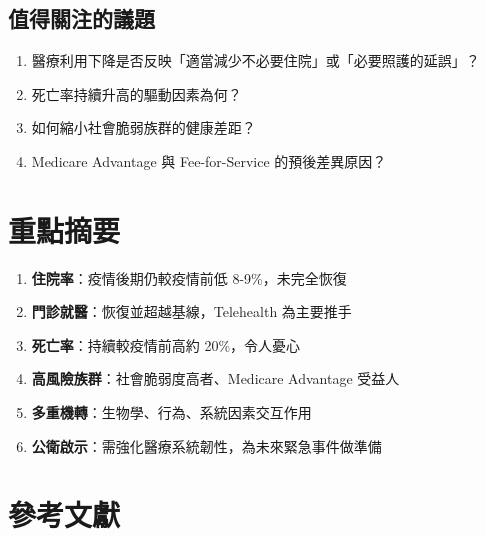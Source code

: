 \documentclass[12pt,a4paper]{article}
\begin{document}
\subsection{值得關注的議題}
\begin{enumerate}
    \item 醫療利用下降是否反映「適當減少不必要住院」或「必要照護的延誤」？
    \item 死亡率持續升高的驅動因素為何？
    \item 如何縮小社會脆弱族群的健康差距？
    \item Medicare Advantage 與 Fee-for-Service 的預後差異原因？
\end{enumerate}

\section{重點摘要}

\begin{enumerate}
    \item \textbf{住院率}：疫情後期仍較疫情前低 8-9\%，未完全恢復
    \item \textbf{門診就醫}：恢復並超越基線，Telehealth 為主要推手
    \item \textbf{死亡率}：持續較疫情前高約 20\%，令人憂心
    \item \textbf{高風險族群}：社會脆弱度高者、Medicare Advantage 受益人
    \item \textbf{多重機轉}：生物學、行為、系統因素交互作用
    \item \textbf{公衛啟示}：需強化醫療系統韌性，為未來緊急事件做準備
\end{enumerate}

\section{參考文獻}
\end{document}
